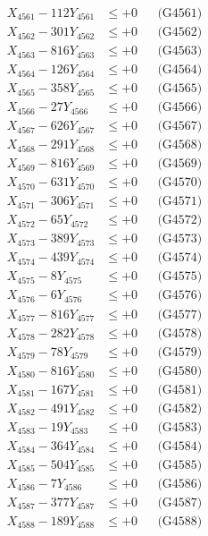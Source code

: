 \documentclass[a4paper,10pt]{article}
\begin{document}
{\begin{align}
\allowbreak
X_{4561} - 112Y_{4561} &\leq +0 && \text{(G4561)} \\
X_{4562} - 301Y_{4562} &\leq +0 && \text{(G4562)} \\
X_{4563} - 816Y_{4563} &\leq +0 && \text{(G4563)} \\
X_{4564} - 126Y_{4564} &\leq +0 && \text{(G4564)} \\
X_{4565} - 358Y_{4565} &\leq +0 && \text{(G4565)} \\
X_{4566} - 27Y_{4566} &\leq +0 && \text{(G4566)} \\
X_{4567} - 626Y_{4567} &\leq +0 && \text{(G4567)} \\
X_{4568} - 291Y_{4568} &\leq +0 && \text{(G4568)} \\
X_{4569} - 816Y_{4569} &\leq +0 && \text{(G4569)} \\
X_{4570} - 631Y_{4570} &\leq +0 && \text{(G4570)} \\
\allowbreak
X_{4571} - 306Y_{4571} &\leq +0 && \text{(G4571)} \\
X_{4572} - 65Y_{4572} &\leq +0 && \text{(G4572)} \\
X_{4573} - 389Y_{4573} &\leq +0 && \text{(G4573)} \\
X_{4574} - 439Y_{4574} &\leq +0 && \text{(G4574)} \\
X_{4575} - 8Y_{4575} &\leq +0 && \text{(G4575)} \\
X_{4576} - 6Y_{4576} &\leq +0 && \text{(G4576)} \\
X_{4577} - 816Y_{4577} &\leq +0 && \text{(G4577)} \\
X_{4578} - 282Y_{4578} &\leq +0 && \text{(G4578)} \\
X_{4579} - 78Y_{4579} &\leq +0 && \text{(G4579)} \\
X_{4580} - 816Y_{4580} &\leq +0 && \text{(G4580)} \\
\allowbreak
X_{4581} - 167Y_{4581} &\leq +0 && \text{(G4581)} \\
X_{4582} - 491Y_{4582} &\leq +0 && \text{(G4582)} \\
X_{4583} - 19Y_{4583} &\leq +0 && \text{(G4583)} \\
X_{4584} - 364Y_{4584} &\leq +0 && \text{(G4584)} \\
X_{4585} - 504Y_{4585} &\leq +0 && \text{(G4585)} \\
X_{4586} - 7Y_{4586} &\leq +0 && \text{(G4586)} \\
X_{4587} - 377Y_{4587} &\leq +0 && \text{(G4587)} \\
X_{4588} - 189Y_{4588} &\leq +0 && \text{(G4588)} \\

\end{align}}
\end{document}
